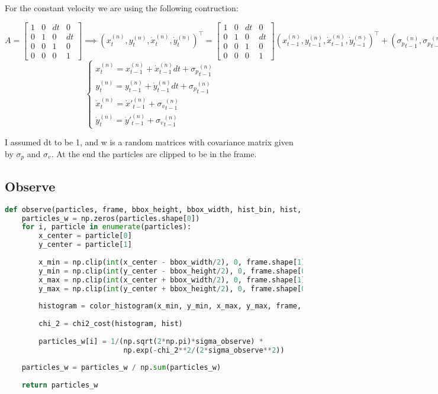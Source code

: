 \documentclass{ETHExercise}
\begin{document}
For the constant velocity we are using the following contruction:
\begin{center}
  $A = \begin{bmatrix}
    1 & 0 & dt & 0\\
    0 & 1 & 0 & dt\\
    0 & 0 & 1 & 0\\
    0 & 0 & 0 & 1
  \end{bmatrix} \implies (x^{(n)}_t, y^{(n)}_t, \dot{x}^{(n)}_t, \dot{y}^{(n)}_t)^\top = \begin{bmatrix}
    1 & 0 & dt & 0\\
    0 & 1 & 0 & dt\\
    0 & 0 & 1 & 0\\
    0 & 0 & 0 & 1
  \end{bmatrix} (x^{(n)}_{t-1}, y^{(n)}_{t-1}, \dot{x}^{(n)}_{t-1}, \dot{y}^{(n)}_{t-1})^\top + ({\sigma_p}^{(n)}_{t-1}, {\sigma_p}^{(n)}_{t-1}, {\sigma_v}^{(n)}_{t-1}, {\sigma_v}^{(n)}_{t-1})^\top=$\\
  \[
  \begin{cases}
    x^{(n)}_t = x^{(n)}_{t-1} + \dot{x}^{(n)}_{t-1} dt + {\sigma_p}^{(n)}_{t-1}& \\
    y^{(n)}_t = y^{(n)}_{t-1} + \dot{y}^{(n)}_{t-1} dt + {\sigma_p}^{(n)}_{t-1}& \\
    \dot{x}^{(n)}_{t} = \dot{x}'^{(n)}_{t-1} + {\sigma_v}^{(n)}_{t-1} &\\
    \dot{y}^{(n)}_{t} = \dot{y}'^{(n)}_{t-1} + {\sigma_v}^{(n)}_{t-1}
  \end{cases}
  \]
\end{center}
I assumed dt to be 1, and w is a random matrices with covariance matrix given by $\sigma_p$ and $\sigma_v$.
At the end the particles are clipped to be in the frame.

\subsection{Observe}
\begin{lstlisting}[language=Python, caption=observe]
  def observe(particles, frame, bbox_height, bbox_width, hist_bin, hist, sigma_observe):
    particles_w = np.zeros(particles.shape[0])
    for i, particle in enumerate(particles):
        x_center = particle[0]
        y_center = particle[1]
        
        x_min = np.clip(int(x_center - bbox_width/2), 0, frame.shape[1]-1)
        y_min = np.clip(int(y_center - bbox_height/2), 0, frame.shape[0]-1)
        x_max = np.clip(int(x_center + bbox_width/2), 0, frame.shape[1]-1)
        y_max = np.clip(int(y_center + bbox_height/2), 0, frame.shape[0]-1)
        
        histogram = color_histogram(x_min, y_min, x_max, y_max, frame, hist_bin)
        
        chi_2 = chi2_cost(histogram, hist)
        
        particles_w[i] = 1/(np.sqrt(2*np.pi)*sigma_observe) * 
                            np.exp(-chi_2**2/(2*sigma_observe**2))
        
    particles_w = particles_w / np.sum(particles_w)
    
    return particles_w
\end{lstlisting}
\end{document}
